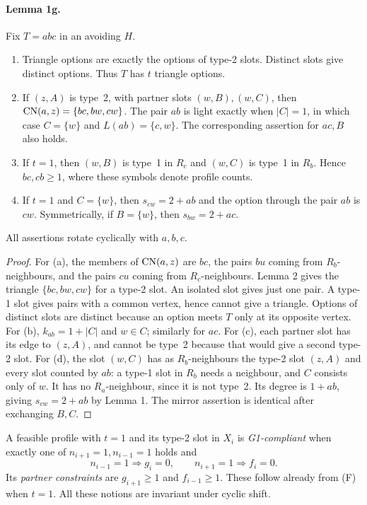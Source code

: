 \paragraph{Lemma 1g.} Fix $T=abc$ in an avoiding $H$.
\begin{enumerate}
\item[(a)] Triangle options are exactly the options of type-2 slots. Distinct slots give distinct options. Thus $T$ has $t$ triangle options.
\item[(b)] If $(z,A)$ is type~2, with partner slots $(w,B),(w,C)$, then $\operatorname{CN}(a,z)=\{bc,bw,cw\}$. The pair $ab$ is light exactly when $|C|=1$, in which case $C=\{w\}$ and $L(ab)=\{c,w\}$. The corresponding assertion for $ac,B$ also holds.
\item[(c)] If $t=1$, then $(w,B)$ is type~1 in $R_c$ and $(w,C)$ is type~1 in $R_b$. Hence $bc,cb\geq1$, where these symbols denote profile counts.
\item[(d)] If $t=1$ and $C=\{w\}$, then $s_{cw}=2+ab$ and the option through the pair $ab$ is $cw$. Symmetrically, if $B=\{w\}$, then $s_{bw}=2+ac$.
\end{enumerate}
All assertions rotate cyclically with $a,b,c$.
\begin{proof}
For (a), the members of $\operatorname{CN}(a,z)$ are $bc$, the pairs $bu$ coming from $R_b$-neighbours, and the pairs $cu$ coming from $R_c$-neighbours. Lemma 2 gives the triangle $\{bc,bw,cw\}$ for a type-2 slot. An isolated slot gives just one pair. A type-1 slot gives pairs with a common vertex, hence cannot give a triangle. Options of distinct slots are distinct because an option meets $T$ only at its opposite vertex.
For (b), $k_{ab}=1+|C|$ and $w\in C$; similarly for $ac$. For (c), each partner slot has its edge to $(z,A)$, and cannot be type~2 because that would give a second type-2 slot.
For (d), the slot $(w,C)$ has as $R_b$-neighbours the type-2 slot $(z,A)$ and every slot counted by $ab$: a type-1 slot in $R_b$ needs a neighbour, and $C$ consists only of $w$. It has no $R_a$-neighbour, since it is not type~2. Its degree is $1+ab$, giving $s_{cw}=2+ab$ by Lemma 1. The mirror assertion is identical after exchanging $B,C$.
\end{proof}
A feasible profile with $t=1$ and its type-2 slot in $X_i$ is \emph{G1-compliant} when exactly one of $n_{i+1}=1,n_{i-1}=1$ holds and
\[
 n_{i-1}=1\Longrightarrow g_i=0,\qquad n_{i+1}=1\Longrightarrow f_i=0.
\]
Its \emph{partner constraints} are $g_{i+1}\geq1$ and $f_{i-1}\geq1$. These follow already from (F) when $t=1$. All these notions are invariant under cyclic shift.
